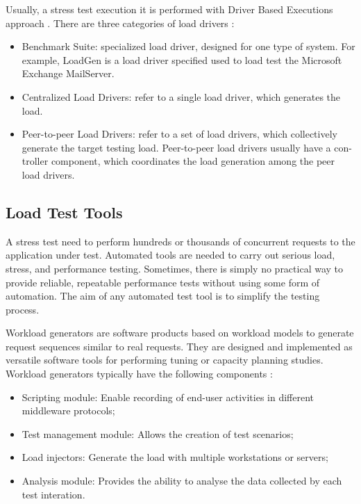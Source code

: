 Usually, a stress test execution it is performed with Driver Based Executions approach \cite{Erinle2013} \cite{MohammadS.Obaidat} \cite{Wang2013}. There are three categories of load drivers \cite{Jiang2010}: 

\begin{itemize}
\item Benchmark Suite: specialized load driver, designed for one type of system. For example, LoadGen is a load driver specified used to load test the Microsoft Exchange MailServer.
\item  Centralized Load Drivers: refer to a single load driver, which generates the load.
\item Peer-to-peer Load Drivers: refer to a set of load drivers, which collectively generate the target testing load. Peer-to-peer load drivers usually have a con- troller component, which coordinates the load generation among the peer load drivers. 
\end{itemize}


\subsection{Load Test Tools}

A stress test need to perform hundreds or thousands of concurrent requests  to the application under test. Automated tools are needed to carry out serious load, stress, and performance testing. Sometimes, there is simply no practical way to provide reliable, repeatable performance tests without using some form of automation. The aim of any automated test tool is to simplify the testing process. 

Workload generators are software products based on workload models to generate request sequences similar to real requests. They are designed and implemented as versatile software tools for performing tuning or capacity planning studies. Workload generators typically have the following components \cite{Molyneaux2009}:

\begin{itemize}
\item Scripting module: Enable recording of end-user activities in different middleware protocols;
\item Test management module: Allows the creation of test scenarios;
\item Load injectors: Generate the load with multiple workstations or servers;
\item Analysis module: Provides the ability to analyse the data collected by each test interation.
\end{itemize}


